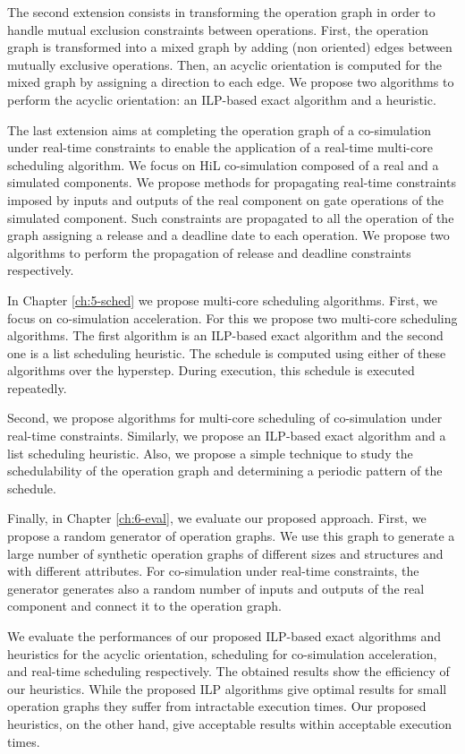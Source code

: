 The second extension consists in transforming the operation graph in order to handle mutual exclusion constraints between operations. First, the operation graph is transformed into a mixed graph by adding (non oriented) edges between mutually exclusive operations. Then, an acyclic orientation is computed for the mixed graph by assigning a direction to each edge. We propose two algorithms to perform the acyclic orientation: an ILP-based exact algorithm and a heuristic.

The last extension aims at completing the operation graph of a co-simulation under real-time constraints to enable the application of a real-time multi-core scheduling algorithm. We focus on HiL co-simulation composed of a real and a simulated components. We propose methods for propagating real-time constraints imposed by inputs and outputs of the real component on gate operations of the simulated component. Such constraints are propagated to all the operation of the graph assigning a release and a deadline date to each operation. We propose two algorithms to perform the propagation of release and deadline constraints respectively.

In Chapter \ref{ch:5-sched} we propose multi-core scheduling algorithms. First, we focus on co-simulation acceleration. For this we propose two multi-core scheduling algorithms. The first algorithm is an ILP-based exact algorithm and the second one is a list scheduling heuristic. The schedule is computed using either of these algorithms over the hyperstep. During execution, this schedule is executed repeatedly.

Second, we propose algorithms for multi-core scheduling of co-simulation under real-time constraints. Similarly, we propose an ILP-based exact algorithm and a list scheduling heuristic. Also, we propose a simple technique to study the schedulability of the operation graph and determining a periodic pattern of the schedule.

Finally, in Chapter \ref{ch:6-eval}, we evaluate our proposed approach. First, we propose a random generator of operation graphs. We use this graph to generate a large number of synthetic operation graphs of different sizes and structures and with different attributes. For co-simulation under real-time constraints, the generator generates also a random number of inputs and outputs of the real component and connect it to the operation graph. 

We evaluate the performances of our proposed ILP-based exact algorithms and heuristics for the acyclic orientation, scheduling for co-simulation acceleration, and real-time scheduling respectively. The obtained results show the efficiency of our heuristics. While the proposed ILP algorithms give optimal results for small operation graphs they suffer from intractable execution times. Our proposed heuristics, on the other hand, give acceptable results within acceptable execution times.

